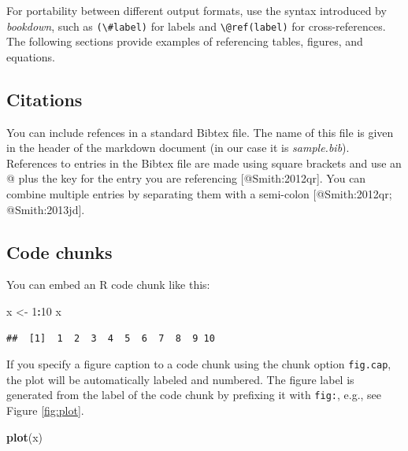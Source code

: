 \documentclass[9pt,a4paper,]{extarticle}
\newenvironment{Shaded}{\begin{snugshade}}{\end{snugshade}}
\newcommand{\KeywordTok}[1]{\textcolor[rgb]{0.13,0.29,0.53}{\textbf{#1}}}
\newcommand{\DecValTok}[1]{\textcolor[rgb]{0.00,0.00,0.81}{#1}}
\newcommand{\StringTok}[1]{\textcolor[rgb]{0.31,0.60,0.02}{#1}}
\newcommand{\OperatorTok}[1]{\textcolor[rgb]{0.81,0.36,0.00}{\textbf{#1}}}
\newcommand{\NormalTok}[1]{#1}
\theoremstyle{definition}
\theoremstyle{definition}
\theoremstyle{remark}
\begin{document}
For portability between different output formats, use the syntax
introduced by \emph{bookdown}, such as
\texttt{(\textbackslash{}\#label)} for labels and
\texttt{\textbackslash{}@ref(label)} for cross-references. The following
sections provide examples of referencing tables, figures, and equations.

\subsection{Citations}\label{citations}

You can include refences in a standard Bibtex file. The name of this
file is given in the header of the markdown document (in our case it is
\emph{sample.bib}). References to entries in the Bibtex file are made
using square brackets and use an @ plus the key for the entry you are
referencing {[}@Smith:2012qr{]}. You can combine multiple entries by
separating them with a semi-colon {[}@Smith:2012qr; @Smith:2013jd{]}.

\subsection{Code chunks}\label{code-chunks}

You can embed an R code chunk like this:

\begin{Shaded}
\begin{Highlighting}[]
\NormalTok{x <-}\StringTok{ }\DecValTok{1}\OperatorTok{:}\DecValTok{10}
\NormalTok{x}
\end{Highlighting}
\end{Shaded}

\begin{verbatim}
##  [1]  1  2  3  4  5  6  7  8  9 10
\end{verbatim}

If you specify a figure caption to a code chunk using the chunk option
\texttt{fig.cap}, the plot will be automatically labeled and numbered.
The figure label is generated from the label of the code chunk by
prefixing it with \texttt{fig:}, e.g., see Figure \ref{fig:plot}.

\begin{Shaded}
\begin{Highlighting}[]
\KeywordTok{plot}\NormalTok{(x)}
\end{Highlighting}
\end{Shaded}
\end{document}
